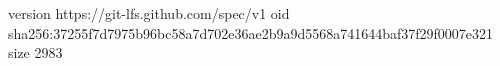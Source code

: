 version https://git-lfs.github.com/spec/v1
oid sha256:37255f7d7975b96bc58a7d702e36ae2b9a9d5568a741644baf37f29f0007e321
size 2983

